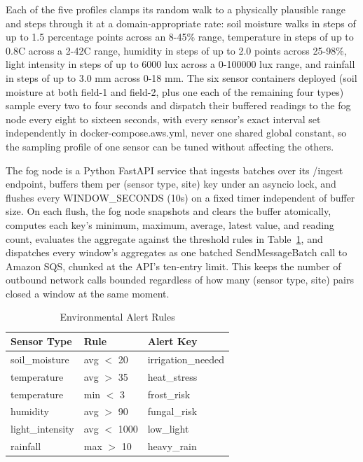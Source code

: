 \documentclass[conference]{IEEEtran}
\begin{document}
Each of the five profiles clamps its random walk to a physically plausible range and steps through it at a domain-appropriate rate: soil moisture walks in steps of up to 1.5 percentage points across an 8-45\% range, temperature in steps of up to 0.8\textdegree{}C across a 2-42\textdegree{}C range, humidity in steps of up to 2.0 points across 25-98\%, light intensity in steps of up to 6000 lux across a 0-100000 lux range, and rainfall in steps of up to 3.0 mm across 0-18 mm. The six sensor containers deployed (soil moisture at both field-1 and field-2, plus one each of the remaining four types) sample every two to four seconds and dispatch their buffered readings to the fog node every eight to sixteen seconds, with every sensor's exact interval set independently in docker-compose.aws.yml, never one shared global constant, so the sampling profile of one sensor can be tuned without affecting the others.

The fog node is a Python FastAPI service that ingests batches over its /ingest endpoint, buffers them per (sensor type, site) key under an asyncio lock, and flushes every WINDOW\_SECONDS (10s) on a fixed timer independent of buffer size. On each flush, the fog node snapshots and clears the buffer atomically, computes each key's minimum, maximum, average, latest value, and reading count, evaluates the aggregate against the threshold rules in Table~\ref{tab:alerts}, and dispatches every window's aggregates as one batched SendMessageBatch call to Amazon SQS, chunked at the API's ten-entry limit. This keeps the number of outbound network calls bounded regardless of how many (sensor type, site) pairs closed a window at the same moment.

\begin{table}[!t]
\caption{Environmental Alert Rules}
\label{tab:alerts}
\centering
\footnotesize
\begin{tabular}{|l|l|l|}
\hline
\textbf{Sensor Type} & \textbf{Rule} & \textbf{Alert Key} \\
\hline
soil\_moisture & avg $<$ 20 & irrigation\_needed \\
\hline
temperature & avg $>$ 35 & heat\_stress \\
\hline
temperature & min $<$ 3 & frost\_risk \\
\hline
humidity & avg $>$ 90 & fungal\_risk \\
\hline
light\_intensity & avg $<$ 1000 & low\_light \\
\hline
rainfall & max $>$ 10 & heavy\_rain \\
\hline
\end{tabular}
\end{table}
\end{document}

